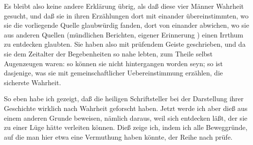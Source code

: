 \begin{aufza}
\begin{aufzb}
\item Es bleibt also keine andere Erklärung übrig, als daß diese vier Männer Wahrheit gesucht, und daß sie in ihren Erzählungen dort mit einander übereinstimmten, wo sie die vorliegende Quelle glaubwürdig fanden, dort von einander abwichen, wo sie aus anderen Quellen (mündlichen Berichten, eigener Erinnerung \udgl ) einen Irrthum zu entdecken glaubten. Sie haben also mit prüfendem Geiste geschrieben, und da sie dem Zeitalter der Begebenheiten so nahe lebten, zum Theile selbst Augenzeugen waren: so können sie nicht hintergangen worden seyn; so ist dasjenige, was sie mit gemeinschaftlicher Uebereinstimmung erzählen, die sicherste Wahrheit.
\end{aufzb}
\end{aufza}

So eben habe ich gezeigt, daß die heiligen Schriftsteller bei der Darstellung ihrer Geschichte wirklich nach Wahrheit geforscht haben. Jetzt werde ich aber dieß aus einem anderen Grunde beweisen, nämlich daraus, weil sich  entdecken läßt, der sie zu einer Lüge hätte verleiten können. Dieß zeige ich, indem ich alle Beweggründe, auf die man hier etwa eine Vermuthung haben könnte, der Reihe nach prüfe.
